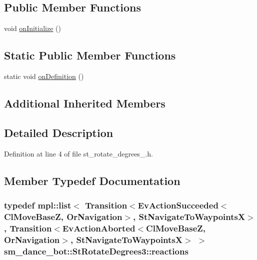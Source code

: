 \subsection*{Public Member Functions}
\begin{DoxyCompactItemize}
\item 
void \hyperlink{structsm__dance__bot_1_1StRotateDegrees3_aa0c183896017fc1f42454fc1d9831d4a}{on\+Initialize} ()
\end{DoxyCompactItemize}
\subsection*{Static Public Member Functions}
\begin{DoxyCompactItemize}
\item 
static void \hyperlink{structsm__dance__bot_1_1StRotateDegrees3_aae35bb91e449f5266b40a42ba757d1cd}{on\+Definition} ()
\end{DoxyCompactItemize}
\subsection*{Additional Inherited Members}


\subsection{Detailed Description}


Definition at line 4 of file st\+\_\+rotate\+\_\+degrees\+\_.\+h.



\subsection{Member Typedef Documentation}
\subsubsection[{\texorpdfstring{reactions}{reactions}}]{\setlength{\rightskip}{0pt plus 5cm}typedef mpl\+::list$<$ Transition$<$Ev\+Action\+Succeeded$<${\bf Cl\+Move\+BaseZ}, {\bf Or\+Navigation}$>$, {\bf St\+Navigate\+To\+WaypointsX}$>$, Transition$<$Ev\+Action\+Aborted$<${\bf Cl\+Move\+BaseZ}, {\bf Or\+Navigation}$>$, {\bf St\+Navigate\+To\+WaypointsX}$>$ $>$ {\bf sm\+\_\+dance\+\_\+bot\+::\+St\+Rotate\+Degrees3\+::reactions}}\hypertarget{structsm__dance__bot_1_1StRotateDegrees3_afbfb018473d5a16b0b111b3b626aca6b}{}\label{structsm__dance__bot_1_1StRotateDegrees3_afbfb018473d5a16b0b111b3b626aca6b}


